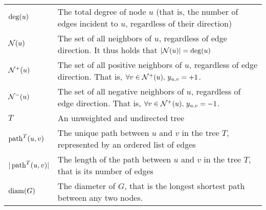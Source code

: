 \begin{table*}[thpb]
\begin{adjustwidth}{-2cm}{}
\begin{tabulary}{179mm}{LL}
    $\operatorname{deg}(u)$ & The total degree of node $u$ (that is, the number of edges incident to $u$,
    regardless of their direction) \\
    $\mathcal{N}(u)$ & The set of all neighbors of $u$, regardless of edge direction. It thus holds
    that $|\mathcal{N}(u)| = \operatorname{deg}(u)$ \\
    $\mathcal{N}^+(u)$ & The set of all positive neighbors of $u$, regardless of edge direction. That is,
    $\forall v \in \mathcal{N}^+(u),\, y_{u, v}{} = +1$. \\
    $\mathcal{N}^-(u)$ & The set of all negative neighbors of $u$, regardless of edge direction. That is,
    $\forall v \in \mathcal{N}^+(u),\, y_{u, v}{} = -1$. \\
    $T$ & An unweighted and undirected tree \\
    $\operatorname{path}^T(u, v)$ & The unique path between $u$ and $v$ in the tree $T$, represented by an ordered list of edges \\
    $|\operatorname{path}^T(u, v)|$ & The length of the path between $u$ and $v$ in the tree $T$, that is its number of edges \\
    $\operatorname{diam}(G)$ & The diameter of $G$, that is the longest shortest path between any two nodes. \\
    \bottomrule
  \end{tabulary}
\end{adjustwidth}
\end{table*}

